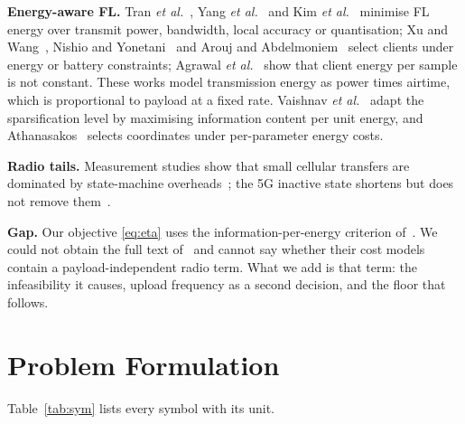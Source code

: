 \documentclass[conference,a4paper]{IEEEtran}
\begin{document}
\textbf{Energy-aware FL.} Tran \emph{et al.}~\cite{tran2019}, Yang \emph{et al.}~\cite{yang2021} and Kim \emph{et al.}~\cite{kim2024} minimise FL energy over transmit power, bandwidth, local accuracy or quantisation; Xu and Wang~\cite{xu2021}, Nishio and Yonetani~\cite{nishio2019} and Arouj and Abdelmoniem~\cite{arouj2022} select clients under energy or battery constraints; Agrawal \emph{et al.}~\cite{agrawal2023} show that client energy per sample is not constant. These works model transmission energy as power times airtime, which is proportional to payload at a fixed rate. Vaishnav \emph{et al.}~\cite{vaishnav2023} adapt the sparsification level by maximising information content per unit energy, and Athanasakos~\cite{athanasakos2026} selects coordinates under per-parameter energy costs.

\textbf{Radio tails.} Measurement studies show that small cellular transfers are dominated by state-machine overheads~\cite{balasubramanian2009,huang2012}; the 5G inactive state shortens but does not remove them~\cite{ding2024}.

\textbf{Gap.} Our objective \eqref{eq:eta} uses the information-per-energy criterion of~\cite{vaishnav2023}. We could not obtain the full text of~\cite{vaishnav2023,athanasakos2026} and cannot say whether their cost models contain a payload-independent radio term. What we add is that term: the infeasibility it causes, upload frequency as a second decision, and the floor that follows.

\section{Problem Formulation}
\label{sec:formulation}
Table~\ref{tab:sym} lists every symbol with its unit.
\end{document}
